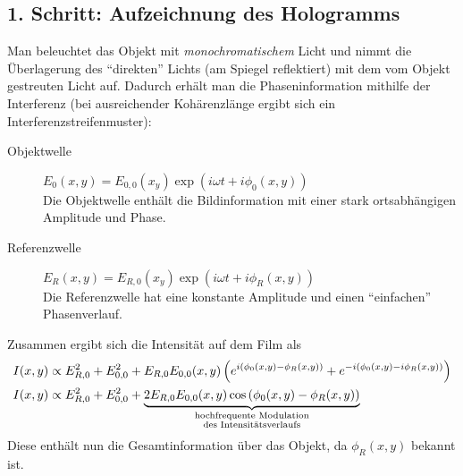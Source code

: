 \subsection*{1. Schritt: Aufzeichnung des Hologramms}%
Man beleuchtet das Objekt mit \emph{monochromatischem} Licht und
nimmt die Überlagerung des \enquote{direkten} Lichts (am Spiegel
reflektiert) mit dem vom Objekt gestreuten Licht auf.
Dadurch erhält man die Phaseninformation mithilfe der Interferenz
(bei ausreichender Kohärenzlänge ergibt sich ein
Interferenzstreifenmuster):
\begin{description}
\item[Objektwelle] 
  $\displaystyle E_0(x,y) = E_{0,0}(x_y)\exp(i\omega t+i\phi_0(x,y))$\\
  Die Objektwelle enthält die Bildinformation mit einer stark
  ortsabhängigen Amplitude und Phase.
\item[Referenzwelle]
  $\displaystyle E_R(x,y) = E_{R,0}(x_y)\exp(i\omega t+ i\phi_R(x,y))$\\
  Die Referenzwelle hat eine konstante Amplitude und einen
  \enquote{einfachen} Phasenverlauf.
\end{description}
Zusammen ergibt sich die Intensität auf dem Film als
\begin{align*}
  I(x,y) & \propto E_{R,0}^2 + E_{0,0}^2 
           + E_{R,0}E_{0,0}(x,y)\left(
           e^{i(\phi_0(x,y)-\phi_R(x,y))}
           + e^{-i(\phi_0(x,y)-i\phi_R(x,y))}
           \right)\\
  I(x,y) &\propto E_{R,0}^2 + E_{0,0}^2 
           + \underbrace{
           2E_{R,0}E_{0,0}(x,y)
           \cos\left(\phi_0(x,y)-\phi_R(x,y)\right)}_{
           \mathclap{\substack{
           \text{hochfrequente Modulation}\\
  \text{des Intensitätsverlaufs}}}
  }
\end{align*}
Diese enthält nun die Gesamtinformation über das Objekt, da
$\phi_R(x,y)$ bekannt ist.


